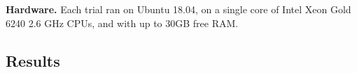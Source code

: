\noindent \textbf{Hardware.} Each trial ran on Ubuntu 18.04, on a single core
of Intel Xeon Gold 6240 2.6 GHz CPUs, and with up to 30GB free RAM.



\subsection{Results}
\label{exp-results}


